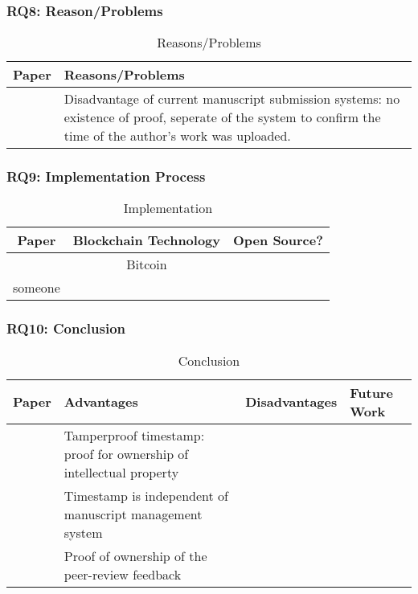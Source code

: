 \subsubsection{RQ8: Reason/Problems}

\begin{longtable}{ |c|p{6cm}| }
	\caption{Reasons/Problems}
	\label{tab:rq8_reason_problem}\\
	\hline
 	\textbf{Paper} & \textbf{Reasons/Problems} \\ [0.5ex] 
 	\hline\hline
 	\endhead
 	\cite{2017_Gipp} & Disadvantage of current manuscript submission systems: no existence of proof, seperate of the system to confirm the time of the author's work was uploaded.\\
	\hline
\end{longtable}

\clearpage
\subsubsection{RQ9: Implementation Process}

\begin{longtable}{ |c|c|c| }
	\caption{Implementation}
	\label{tab:rq9_implementation_process}\\
	\hline
 	\textbf{Paper} & Blockchain Technology & \textbf{Open Source?} \\ [0.5ex] 
 	\hline\hline
 	\endhead
 	\cite{2017_Gipp} & Bitcoin & \cmark \\
	\hline
	someone & \xmark \\
	\hline
\end{longtable}

\clearpage
\subsubsection{RQ10: Conclusion}

\begin{longtable}{ |c|p{4cm}|p{4cm}|p{4cm}| }
	\caption{Conclusion}
	\label{tab:rq10_conclusion}\\
	\hline
 	\textbf{Paper} & \textbf{Advantages} & \textbf{Disadvantages} & \textbf{Future Work}\\ [0.5ex] 
 	\hline\hline
 	\endhead
 	\multirow{3}{*}{\cite{2017_Gipp}} & Tamperproof timestamp: proof for ownership of intellectual property & \multirow{3}{*}{\xmark } & \\
	\cline{2-2}
	 & Timestamp is independent of manuscript management system & & \\
	\cline{2-2}
	 & Proof of ownership of the peer-review feedback & & \\
	\hline
\end{longtable}
